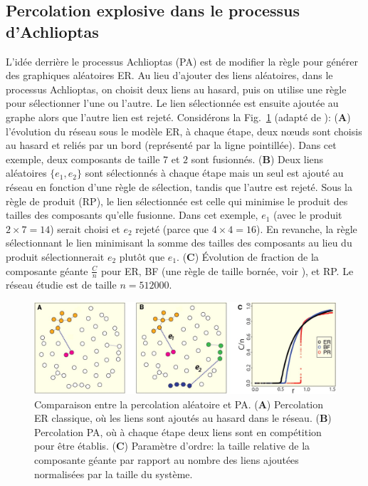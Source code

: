 \subsection{Percolation explosive dans le processus d'Achlioptas}

L'idée derrière le processus Achlioptas (PA) \cite{Achlioptas-al2009} est de modifier la règle pour générer des graphiques aléatoires ER. Au lieu d'ajouter des liens aléatoires, dans le processus Achlioptas, on choisit deux liens au hasard, puis on utilise une règle pour sélectionner l'une ou l'autre. Le lien sélectionnée est ensuite ajoutée au graphe alors que l'autre lien est rejeté. Considérons la Fig.~\ref{achlioptas} (adapté de \cite{Achlioptas-al2009}): (\textbf{A}) l'évolution du réseau  sous le modèle ER, à chaque étape, deux nœuds sont choisis au hasard et reliés par un bord (représenté par la ligne pointillée). Dans cet exemple, deux composants de taille $7$ et $2$ sont fusionnés. (\textbf{B}) Deux liens aléatoires $\{e_1,e_2\}$ sont sélectionnés à chaque étape mais un seul est ajouté au réseau en fonction d'une règle de sélection, tandis que l'autre est rejeté.
Sous la règle de produit (RP), le lien sélectionnée est celle qui minimise le produit des tailles des composants qu'elle fusionne. Dans cet exemple, $e_1$ (avec le produit $2\times7=14$) serait choisi et $e_2$ rejeté (parce que $4\times4=16$). En revanche, la règle sélectionnant le lien minimisant la somme des tailles des composants au lieu du produit sélectionnerait $e_2$ plutôt que $e_1$. (\textbf{C}) Évolution de fraction de la composante géante  $\frac{C}{n}$ pour ER, BF (une règle de taille bornée, voir \cite{Bohman-Frieze2001}), et RP. Le réseau étudie est de taille $n=512000$.
\begin{figure}[h!]
	\centering
	\includegraphics[scale=0.35]{./figures/achlioptas3}
	\caption{Comparaison entre la percolation aléatoire et PA. (\textbf{A}) Percolation ER classique, où les liens sont ajoutés au hasard dans le réseau. (\textbf{B}) Percolation PA, où à chaque étape deux liens sont en compétition pour être établis. (\textbf{C}) Paramètre d'ordre: la taille relative de la composante géante par rapport au nombre des liens ajoutées normalisées par la taille du système.}
	\label{achlioptas}
\end{figure}

